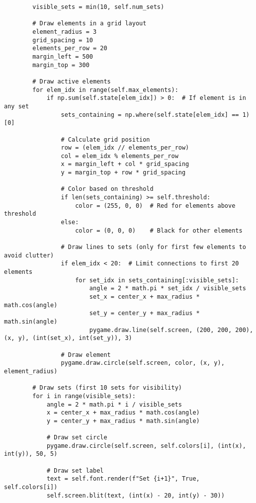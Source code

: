 \begin{lstlisting}
        visible_sets = min(10, self.num_sets)

        # Draw elements in a grid layout
        element_radius = 3
        grid_spacing = 10
        elements_per_row = 20
        margin_left = 500
        margin_top = 300
        
        # Draw active elements
        for elem_idx in range(self.max_elements):
            if np.sum(self.state[elem_idx]) > 0:  # If element is in any set
                sets_containing = np.where(self.state[elem_idx] == 1)[0]
                
                # Calculate grid position
                row = (elem_idx // elements_per_row)
                col = elem_idx % elements_per_row
                x = margin_left + col * grid_spacing
                y = margin_top + row * grid_spacing
                
                # Color based on threshold
                if len(sets_containing) >= self.threshold:
                    color = (255, 0, 0)  # Red for elements above threshold
                else:
                    color = (0, 0, 0)    # Black for other elements
                
                # Draw lines to sets (only for first few elements to avoid clutter)
                if elem_idx < 20:  # Limit connections to first 20 elements
                    for set_idx in sets_containing[:visible_sets]:
                        angle = 2 * math.pi * set_idx / visible_sets
                        set_x = center_x + max_radius * math.cos(angle)
                        set_y = center_y + max_radius * math.sin(angle)
                        pygame.draw.line(self.screen, (200, 200, 200), (x, y), (int(set_x), int(set_y)), 3)

                # Draw element
                pygame.draw.circle(self.screen, color, (x, y), element_radius)    
        
        # Draw sets (first 10 sets for visibility)
        for i in range(visible_sets):
            angle = 2 * math.pi * i / visible_sets
            x = center_x + max_radius * math.cos(angle)
            y = center_y + max_radius * math.sin(angle)
            
            # Draw set circle
            pygame.draw.circle(self.screen, self.colors[i], (int(x), int(y)), 50, 5)
            
            # Draw set label
            text = self.font.render(f"Set {i+1}", True, self.colors[i])
            self.screen.blit(text, (int(x) - 20, int(y) - 30))



\end{lstlisting}

